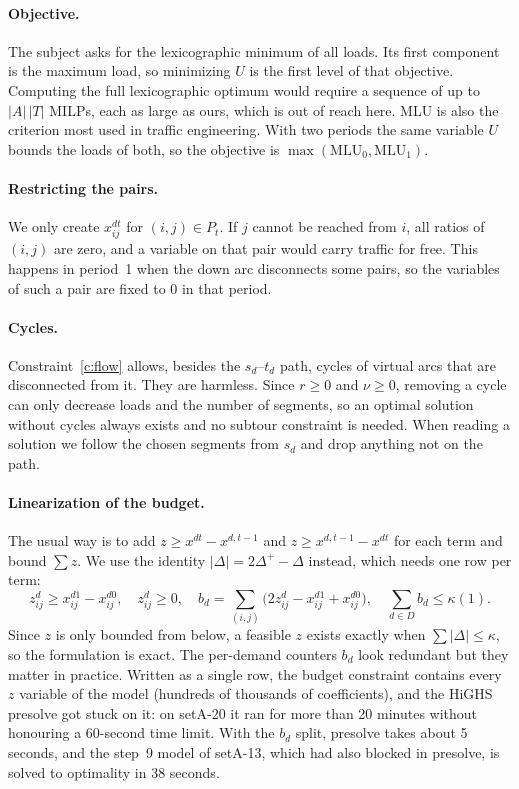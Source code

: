 \documentclass[11pt,a4paper]{article}
\newcommand{\MLU}{\mathrm{MLU}}
\begin{document}
\paragraph{Objective.}
The subject asks for the lexicographic minimum of all loads. Its first component is the maximum
load, so minimizing $U$ is the first level of that objective. Computing the full lexicographic
optimum would require a sequence of up to $|A|\,|T|$ MILPs, each as large as ours, which is out of
reach here. MLU is also the criterion most used in traffic engineering. With two periods the same
variable $U$ bounds the loads of both, so the objective is $\max(\MLU_0,\MLU_1)$.

\paragraph{Restricting the pairs.}
We only create $x^{dt}_{ij}$ for $(i,j)\in P_t$. If $j$ cannot be reached from $i$, all ratios of
$(i,j)$ are zero, and a variable on that pair would carry traffic for free. This happens in period~1
when the down arc disconnects some pairs, so the variables of such a pair are fixed to 0 in that
period.

\paragraph{Cycles.}
Constraint~\eqref{c:flow} allows, besides the $s_d$--$t_d$ path, cycles of virtual arcs that are
disconnected from it. They are harmless. Since $r\ge 0$ and $\nu\ge 0$, removing a cycle can only
decrease loads and the number of segments, so an optimal solution without cycles always exists and
no subtour constraint is needed. When reading a solution we follow the chosen segments from $s_d$
and drop anything not on the path.

\paragraph{Linearization of the budget.}
The usual way is to add $z\ge x^{dt}-x^{d,t-1}$ and $z\ge x^{d,t-1}-x^{dt}$ for each term and bound
$\sum z$. We use the identity $|\Delta|=2\Delta^+-\Delta$ instead, which needs one row per term:
\begin{equation}
  z^d_{ij}\ge x^{d1}_{ij}-x^{d0}_{ij},\quad z^d_{ij}\ge 0,\quad
  b_d=\sum_{(i,j)}\bigl(2z^d_{ij}-x^{d1}_{ij}+x^{d0}_{ij}\bigr),\quad
  \sum_{d\in D} b_d\le\kappa(1).
\end{equation}
Since $z$ is only bounded from below, a feasible $z$ exists exactly when $\sum|\Delta|\le\kappa$, so
the formulation is exact. The per-demand counters $b_d$ look redundant but they matter in practice.
Written as a single row, the budget constraint contains every $z$ variable of the model (hundreds of
thousands of coefficients), and the HiGHS presolve got stuck on it: on setA-20 it ran for more than
20 minutes without honouring a 60-second time limit. With the $b_d$ split, presolve takes about
5 seconds, and the step~9 model of setA-13, which had also blocked in presolve, is solved to
optimality in 38 seconds.
\end{document}
